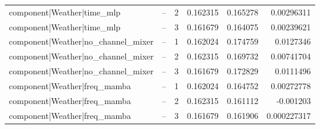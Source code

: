 \begin{longtable}{llrrrr}
component|Weather|time\_mlp & -- & 2 & 0.162315 & 0.165278 & 0.00296311 \\
component|Weather|time\_mlp & -- & 3 & 0.161679 & 0.164075 & 0.00239621 \\
component|Weather|no\_channel\_mixer & -- & 1 & 0.162024 & 0.174759 & 0.0127346 \\
component|Weather|no\_channel\_mixer & -- & 2 & 0.162315 & 0.169732 & 0.00741704 \\
component|Weather|no\_channel\_mixer & -- & 3 & 0.161679 & 0.172829 & 0.0111496 \\
component|Weather|freq\_mamba & -- & 1 & 0.162024 & 0.164752 & 0.00272778 \\
component|Weather|freq\_mamba & -- & 2 & 0.162315 & 0.161112 & -0.001203 \\
component|Weather|freq\_mamba & -- & 3 & 0.161679 & 0.161906 & 0.000227317 \\
\bottomrule
\end{longtable}
